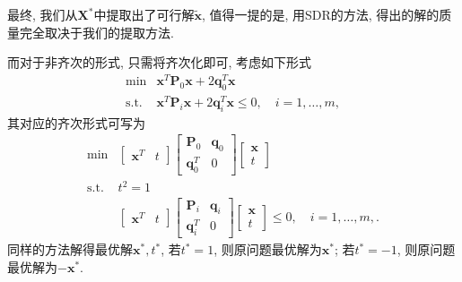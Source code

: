 \documentclass[a4paper,12pt]{article}
\begin{document}
最终, 我们从$\bm{X}^*$中提取出了可行解$\tilde{\bm{x}}$, 值得一提的是, 用SDR的方法, 得出的解的质量完全取决于我们的提取方法.

而对于非齐次的形式, 只需将齐次化即可, 考虑如下形式
\begin{equation}
\begin{array}{cl}
{\min} & {\bm{x}^T \bm{P}_0 \bm{x} + 2 \bm{q}_0^T \bm{x}} \\
{\text{s.t.}} & {\bm{x}^T\bm{P}_i \bm{x} + 2 \bm{q}_i^T \bm{x} \leq 0,\quad i=1,\dots,m},
\end{array}
\end{equation}
其对应的齐次形式可写为
\begin{equation}
\begin{array}{cl}
{\min} & {\begin{bmatrix} {\bm {x}^T} & { t } \end{bmatrix} 
\begin{bmatrix} {\bm{P}_0 } & {\bm{q}_0} \\ {\bm{q }_0^{ T }} & {0} \end{bmatrix} 
\begin{bmatrix} {\bm{x} } \\ {t} \end{bmatrix} } \\
{\text{s.t.}} & t^2=1 \\
{} & {\begin{bmatrix} {\bm {x}^T} & { t } \end{bmatrix} 
\begin{bmatrix} {\bm{P}_i } & {\bm{q}_i} \\ {\bm{q }_i^{ T }} & {0} \end{bmatrix} 
\begin{bmatrix} {\bm{x} } \\ {t} \end{bmatrix} \leq 0,\quad i=1,\dots,m,}.
\end{array}
\end{equation}
同样的方法解得最优解$\bm{x}^*,t^*$, 若$t^*=1$, 则原问题最优解为$\bm{x}^*$; 若$t^*=-1$, 则原问题最优解为$-\bm{x}^*$.
\end{document}
